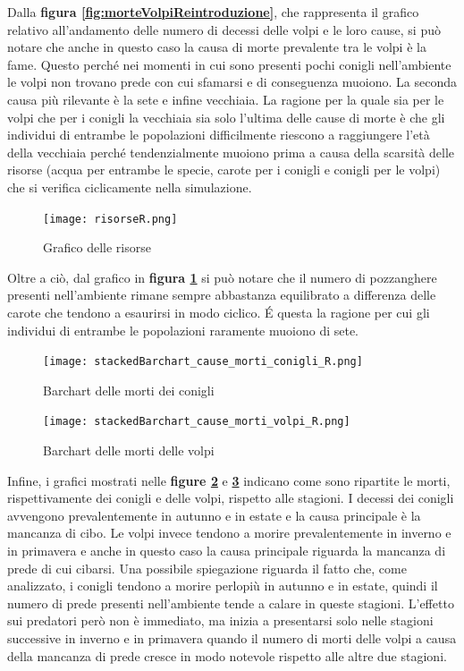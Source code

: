 \documentclass[11pt]{article}
\begin{document}
Dalla \textbf{figura \ref{fig:morteVolpiReintroduzione}}, che rappresenta il grafico relativo all'andamento delle numero di decessi delle volpi e le loro cause, si può notare che anche in questo caso la causa di morte prevalente tra le volpi è la fame. Questo perché nei momenti in cui sono presenti pochi conigli nell'ambiente le volpi non trovano prede con cui sfamarsi e di conseguenza muoiono. La seconda causa più rilevante è la sete e infine vecchiaia. La ragione per la quale sia per le volpi che per i conigli la vecchiaia sia solo l'ultima delle cause di morte è che gli individui di entrambe le popolazioni difficilmente riescono a raggiungere l'età della vecchiaia perché tendenzialmente muoiono prima a causa della scarsità delle risorse (acqua per entrambe le specie, carote per i conigli e conigli per le volpi) che si verifica ciclicamente nella simulazione. 



\begin{figure}[!ht]
     \centering
     \texttt{[image: risorseR.png]}
     \caption{Grafico delle risorse}
     \label{fig:risorseReintroduzione}
\end{figure}


Oltre a ciò, dal grafico in \textbf{figura \ref{fig:risorseReintroduzione}} si può notare che il numero di pozzanghere presenti nell'ambiente rimane sempre abbastanza equilibrato a differenza delle carote che tendono a esaurirsi in modo ciclico. É questa la ragione per cui gli individui di entrambe le popolazioni raramente muoiono di sete.

\newpage

\begin{figure}[!ht]
    \hspace{-1.7cm}
     \texttt{[image: stackedBarchart\_cause\_morti\_conigli\_R.png]}
     \caption{Barchart delle morti dei conigli}
     \label{fig:barchartConigliR}
\end{figure}
\begin{figure}[!ht]
    \hspace{-1.7cm}
     \texttt{[image: stackedBarchart\_cause\_morti\_volpi\_R.png]}
     \caption{Barchart delle morti delle volpi}
     \label{fig:barchhartVolpiR}
\end{figure}

Infine, i grafici mostrati nelle \textbf{figure \ref{fig:barchartConigliR}} e \textbf{\ref{fig:barchhartVolpiR}} indicano come sono ripartite le morti, rispettivamente dei conigli e delle volpi, rispetto alle stagioni. I decessi dei conigli avvengono prevalentemente in autunno e in estate e la causa principale è la mancanza di cibo. Le volpi invece tendono a morire prevalentemente in inverno e in primavera e anche in questo caso la causa principale riguarda la mancanza di prede di cui cibarsi. Una possibile spiegazione riguarda il fatto che, come analizzato, i conigli tendono a morire perlopiù in autunno e in estate, quindi il numero di prede presenti nell'ambiente tende a calare in queste stagioni. L'effetto sui predatori però non è immediato, ma inizia a presentarsi solo nelle stagioni successive in inverno e in primavera quando il numero di morti delle volpi a causa della mancanza di prede cresce in modo notevole rispetto alle altre due stagioni.  
\end{document}
